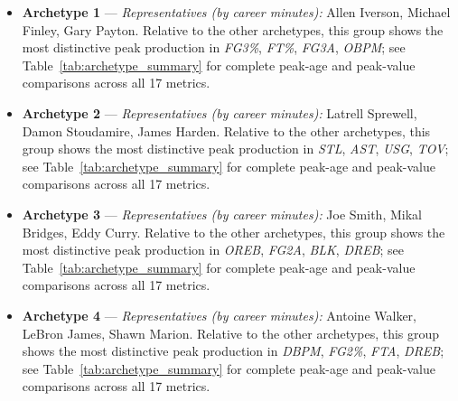\begin{itemize}
\item \textbf{Archetype 1} --- \emph{Representatives (by career minutes):} Allen Iverson, Michael Finley, Gary Payton. Relative to the other archetypes, this group shows the most distinctive peak production in \textit{FG3\%}, \textit{FT\%}, \textit{FG3A}, \textit{OBPM}; see Table~\ref{tab:archetype_summary} for complete peak-age and peak-value comparisons across all 17 metrics.
\item \textbf{Archetype 2} --- \emph{Representatives (by career minutes):} Latrell Sprewell, Damon Stoudamire, James Harden. Relative to the other archetypes, this group shows the most distinctive peak production in \textit{STL}, \textit{AST}, \textit{USG}, \textit{TOV}; see Table~\ref{tab:archetype_summary} for complete peak-age and peak-value comparisons across all 17 metrics.
\item \textbf{Archetype 3} --- \emph{Representatives (by career minutes):} Joe Smith, Mikal Bridges, Eddy Curry. Relative to the other archetypes, this group shows the most distinctive peak production in \textit{OREB}, \textit{FG2A}, \textit{BLK}, \textit{DREB}; see Table~\ref{tab:archetype_summary} for complete peak-age and peak-value comparisons across all 17 metrics.
\item \textbf{Archetype 4} --- \emph{Representatives (by career minutes):} Antoine Walker, LeBron James, Shawn Marion. Relative to the other archetypes, this group shows the most distinctive peak production in \textit{DBPM}, \textit{FG2\%}, \textit{FTA}, \textit{DREB}; see Table~\ref{tab:archetype_summary} for complete peak-age and peak-value comparisons across all 17 metrics.
\end{itemize}
